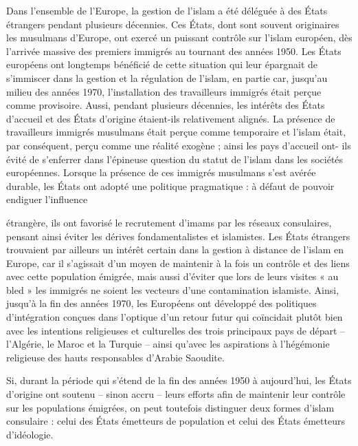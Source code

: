 Dans l'ensemble de l'Europe, la gestion de l'islam a été déléguée à des
États étrangers pendant plusieurs décennies. Ces États, dont sont
souvent originaires les musulmans d'Europe, ont exercé un puissant
contrôle sur l'islam européen, dès l'arrivée massive des premiers
immigrés au tournant des années 1950. Les États européens ont longtemps
bénéficié de cette situation qui leur épargnait de s'immiscer dans la
gestion et la régulation de l'islam, en partie car, jusqu'au milieu des
années 1970, l'installation des travailleurs immigrés était perçue comme
provisoire. Aussi, pendant plusieurs décennies, les intérêts des États
d'accueil et des États d'origine étaient-ils relativement alignés. La
présence de travailleurs immigrés musulmans était perçue comme
temporaire et l'islam était, par conséquent, perçu comme une réalité
exogène ; ainsi les pays d'accueil ont- ils évité de s'enferrer dans
l'épineuse question du statut de l'islam dans les sociétés européennes.
Lorsque la présence de ces immigrés musulmans s'est avérée durable, les
États ont adopté une politique pragmatique : à défaut de pouvoir
endiguer l'influence



étrangère, ils ont favorisé le recrutement d'imams par les réseaux
consulaires, pensant ainsi éviter les dérives fondamentalistes et
islamistes. Les États étrangers trouvaient par ailleurs un intérêt
certain dans la gestion à distance de l'islam en Europe, car il
s'agissait d'un moyen de maintenir à la fois un contrôle et des liens
avec cette population émigrée, mais aussi d'éviter que lors de leurs
visites « au bled » les immigrés ne soient les vecteurs d'une
contamination islamiste. Ainsi, jusqu'à la fin des années 1970, les
Européens ont développé des politiques d'intégration conçues dans
l'optique d'un retour futur qui coïncidait plutôt bien avec les
intentions religieuses et culturelles des trois principaux pays de
départ -- l'Algérie, le Maroc et la Turquie -- ainsi qu'avec les
aspirations à l'hégémonie religieuse des hauts responsables d'Arabie
Saoudite.

Si, durant la période qui s'étend de la fin des années 1950 à
aujourd'hui, les États d'origine ont soutenu -- sinon accru -- leurs
efforts afin de maintenir leur contrôle sur les populations émigrées, on
peut toutefois distinguer deux formes d'islam consulaire : celui des
États émetteurs de population et celui des États émetteurs d'idéologie.


